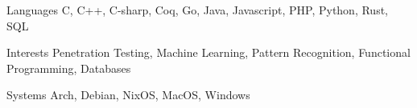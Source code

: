 
\begin{cvskills}
  \cvskill
    {Languages}
    {C, C++, C-sharp, Coq, Go, Java, Javascript, PHP, Python, Rust, SQL}

  \cvskill
    {Interests}
    {Penetration Testing, Machine Learning, Pattern Recognition, Functional Programming, Databases}

  \cvskill
    {Systems}
    {Arch, Debian, NixOS, MacOS, Windows}
\end{cvskills}

